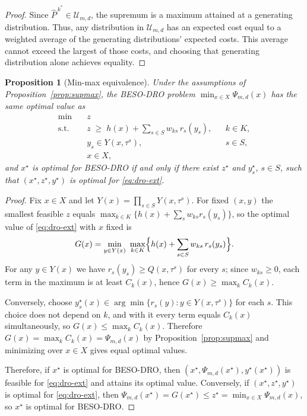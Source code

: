 \documentclass[mnsc,sglanonrev]{informs4}  %
\newtheorem{proposition}{Proposition}
\theoremstyle{remark}\newtheorem{remark}{Remark}
\begin{document}
\begin{APPENDICES}
\begin{proof}
\noindent Since $\widehat P^{\,k^*}\in\mathcal U_{m,d}$, the supremum is a maximum attained at a generating distribution. Thus, any distribution in \(\mathcal U_{m,d}\) has an expected cost equal to a weighted average of the generating distributions’ expected costs. This average cannot exceed the largest of those costs, and choosing that generating distribution alone achieves equality.
\end{proof}

\begin{proposition}[Min-max equivalence]\label{prop:minmax}
Under the assumptions of Proposition~\ref{prop:supmax}, the BESO-DRO problem $\min_{x\in X}\Psi_{m,d}(x)$ has the same optimal value as
\begin{equation}\label{eq:dro-ext}
\begin{aligned}
\min \quad & z\\
\text{s.t.}\quad & z\;\ge\; h(x)+\sum_{s\in S}w_{ks}\,r_s(y_s), && k\in K,\\
& y_s\in Y(x,\tau^s), && s\in S,\\
& x\in X,
\end{aligned}
\end{equation}
and $x^\star$ is optimal for BESO-DRO if and only if there exist $z^\star$ and $y_s^\star$, $s\in S$, such that $(x^\star,z^\star,y^\star)$ is optimal for \eqref{eq:dro-ext}.
\end{proposition}
\begin{proof}
Fix $x\in X$ and let $Y(x)=\prod_{s\in S}Y(x,\tau^s)$. For fixed $(x,y)$ the smallest feasible $z$ equals $\max_{k\in K}\{h(x)+\sum_{s}w_{ks}r_s(y_s)\}$, so the optimal value of \eqref{eq:dro-ext} with $x$ fixed is
\[
G(x)=\min_{y\in Y(x)}\ \max_{k\in K}\Bigl\{h(x)+\sum_{s\in S}w_{ks}\,r_s(y_s)\Bigr\}.
\]
For any $y\in Y(x)$ we have $r_s(y_s)\ge Q(x,\tau^s)$ for every $s$; since $w_{ks}\ge 0$, each term in the maximum is at least $C_k(x)$, hence $G(x)\ge\max_{k}C_k(x)$. 

Conversely, choose $y_s^\star(x)\in\arg\min\{r_s(y):y\in Y(x,\tau^s)\}$ for each $s$. This choice does not depend on $k$, and with it every term equals $C_k(x)$ simultaneously, so $G(x)\le\max_k C_k(x)$. Therefore $G(x)=\max_k C_k(x)=\Psi_{m,d}(x)$ by Proposition~\ref{prop:supmax} and minimizing over $x\in X$ gives equal optimal values.

Therefore, if $x^\star$ is optimal for BESO-DRO, then $(x^\star,\Psi_{m,d}(x^\star),y^\star(x^\star))$ is feasible for \eqref{eq:dro-ext} and attains its optimal value. Conversely, if $(x^\star,z^\star,y^\star)$ is optimal for \eqref{eq:dro-ext}, then $\Psi_{m,d}(x^\star)=G(x^\star)\le z^\star=\min_{x\in X}\Psi_{m,d}(x)$, so $x^\star$ is optimal for BESO-DRO.
\end{proof}


\end{APPENDICES}
\end{document}
